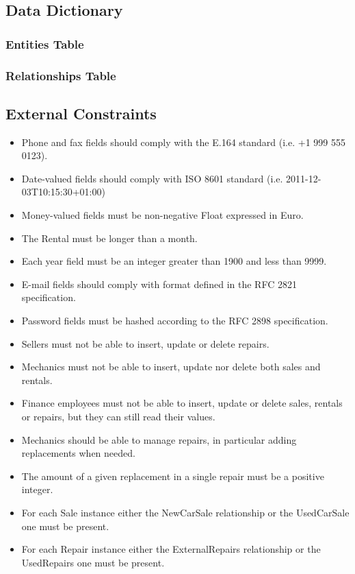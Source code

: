 \subsection{Data Dictionary}

\subsubsection{Entities Table}



\subsubsection{Relationships Table}


\subsection{External Constraints}
\begin{itemize}
    \item Phone and fax fields should comply with the E.164 standard (i.e. +1 999 555 0123).
    \item Date-valued fields should comply with ISO 8601 standard (i.e. 2011-12-03T10:15:30+01:00)
    \item Money-valued fields must be non-negative Float expressed in Euro.
    \item The Rental must be longer than a month.
    \item Each year field must be an integer greater than 1900 and less than 9999.
    \item E-mail fields should comply with format defined in the RFC 2821 specification.
    \item Password fields must be hashed according to the RFC 2898 specification.
    \item Sellers must not be able to insert, update or delete repairs.
    \item Mechanics must not be able to insert, update nor delete both sales and rentals.
    \item Finance employees must not be able to insert, update or delete sales, rentals or repairs, but they can still read their values.
    \item Mechanics should be able to manage repairs, in particular adding replacements when needed.
    \item The amount of a given replacement in a single repair must be a positive integer.
    \item For each Sale instance either the NewCarSale relationship or the UsedCarSale one must be present.
    \item For each Repair instance either the ExternalRepairs relationship or the UsedRepairs one must be present.
\end{itemize}

